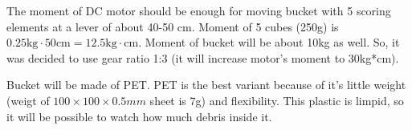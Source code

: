 \begin{enumerate*}
  	The moment of DC motor should be enough for moving bucket with 5 scoring elements at a lever of about 40-50 cm. Moment of 5 cubes (250g) is $0.25\text{kg} \cdot 50\text{cm} = 12.5\text{kg} \cdot \text{cm}$. Moment of bucket will be about 10kg as well. So, it was decided to use gear ratio 1:3 (it will increase motor's moment to 30kg*cm).
  	\begin{figure}[H]
  		\begin{minipage}[h]{1\linewidth}
  		  \caption{}
  		\end{minipage}
  	\end{figure}
  	\item Bucket will be made of PET. PET is the best variant because of it's little weight (weigt of $100\times 100 \times 0.5mm$ sheet is 7g) and flexibility. This plastic is limpid, so it will be possible to watch how much debris inside it.
  	

\end{enumerate*}
